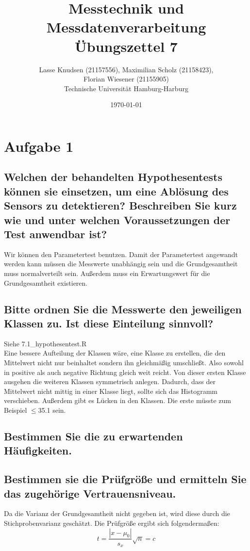 \documentclass[12pt, a4paper, titlepage]{article}
\title{Messtechnik und Messdatenverarbeitung \\ \"Ubungszettel 7}
\author{Lasse Knudsen (21157556), Maximilian Scholz (21158423), \\
	Florian Wiesener (21155905)  \\
	Technische Universit\"at Hamburg-Harburg \\
}
\date{\today}
\begin{document}
	\maketitle
	 \section{Aufgabe 1}
	 \label{sec:a1}
	 
	\subsection{Welchen der behandelten Hypothesentests k\"onnen sie einsetzen, um eine Abl\"osung des Sensors zu
	 	detektieren? Beschreiben Sie kurz wie und unter welchen Voraussetzungen der Test anwendbar ist?}
	Wir k\"onnen den Parametertest benutzen. Damit der Parametertest angewandt werden kann m\"ussen die Messwerte unabh\"angig sein und die Grundgesamtheit muss normalverteilt sein. Au\ss erdem muss ein Erwartungswert f\"ur die Grundgesamtheit existieren.
	
	\subsection{Bitte ordnen Sie die Messwerte den jeweiligen Klassen zu. Ist diese Einteilung sinnvoll?}
	
	Siehe 7.1\_hypothesentest.R \\
	Eine bessere Aufteilung der Klassen w\"are, eine Klasse zu erstellen, die den Mittelwert nicht nur beinhaltet sondern ihn gleichm\"a\ss ig umschlie\ss t. Also sowohl in positive als auch negative Richtung gleich weit reicht. Von dieser ersten Klasse ausgehen die weiteren Klassen symmetrisch anlegen. Dadurch, dass der Mittelwert nicht mittig in einer Klasse liegt, sollte sich das Histogramm verschieben.
	Au\ss erdem gibt es L\"ucken in den Klassen. Die erste m\"usste zum Beispiel $\leq$35.1 sein.
	
	\subsection{Bestimmen Sie die zu erwartenden H\"aufigkeiten.}
	
	
	\subsection{Bestimmen sie die Pr\"ufgr\"o\ss e und ermitteln Sie das zugeh\"orige Vertrauensniveau.}
	Da die Varianz der Grundgesamtheit nicht gegeben ist, wird diese durch die Stichprobenvarianz gesch\"atzt.
	Die Pr\"ufgr\"o\ss e ergibt sich folgenderma\ss en:
	$$t=\frac{|x - \mu_0|}{s_x}\sqrt{n} = c$$
	
\end{document}
